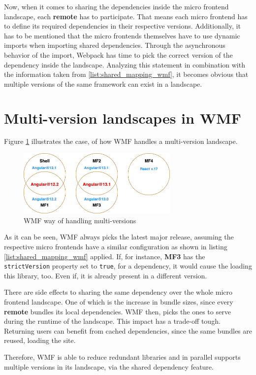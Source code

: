Now, when it comes to sharing the dependencies inside the micro frontend landscape, each \textbf{remote} has to participate. That means each micro frontend has to define its required dependencies in their respective versions. Additionally, it has to be mentioned that the micro frontends themselves have to use dynamic imports when importing shared dependencies. Through the asynchronous behavior of the import, Webpack has time to pick the correct version of the dependency inside the landscape.\cite{wmf_concepts}
Analyzing this statement in combination with the information taken from \ref{list:shared_mapping_wmf}, it becomes obvious that multiple versions of the same framework can exist in a landscape. 

\section{Multi-version landscapes in WMF}

Figure \ref{fig:wmf_multiversions} illustrates the case, of how WMF handles a multi-version landscape.

\begin{figure}[!h]
	\centering
	\includegraphics[width=0.7\textwidth]{Figures/multi_version_diagramm.drawio.png}
	\caption{WMF way of handling multi-versions}
	\label{fig:wmf_multiversions}
\end{figure}

As it can be seen, WMF always picks the latest major release, assuming the respective micro frontends have a similar configuration as shown in listing \ref{list:shared_mapping_wmf} applied. If, for instance, \textbf{MF3} has the \texttt{strictVersion} property set to \texttt{true}, for a dependency, it would cause the loading this library, too. Even if, it is already present in a different version.

There are side effects to sharing the same dependency over the whole micro frontend landscape. One of which is the increase in bundle sizes, since every \textbf{remote} bundles its local dependencies. WMF then, picks the ones to serve during the runtime of the landscape.
This impact has a trade-off tough. Returning users can benefit from cached dependencies, since the same bundles are reused, loading the site.\cite{wmf_multi_versions}

Therefore, WMF is able to reduce redundant libraries and in parallel supports multiple versions in its landscape, via the shared dependency feature.